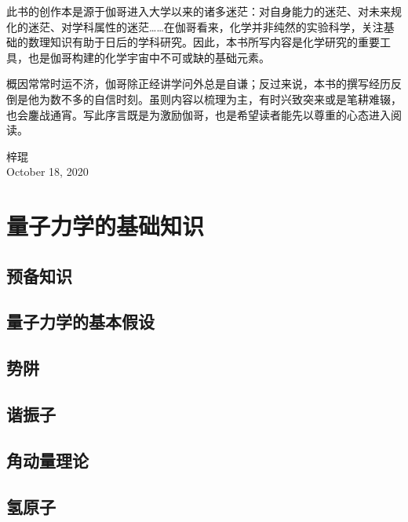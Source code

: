 \documentclass[cn,11pt,chinese,toc= twocol]{elegantbook}
\begin{document}
此书的创作本是源于伽哥进入大学以来的诸多迷茫：对自身能力的迷茫、对未来规化的迷茫、对学科属性的迷茫……在伽哥看来，化学并非纯然的实验科学，关注基础的数理知识有助于日后的学科研究。因此，本书所写内容是化学研究的重要工具，也是伽哥构建的化学宇宙中不可或缺的基础元素。

概因常常时运不济，伽哥除正经讲学问外总是自谦；反过来说，本书的撰写经历反倒是他为数不多的自信时刻。虽则内容以梳理为主，有时兴致突来或是笔耕难辍，也会鏖战通宵。写此序言既是为激励伽哥，也是希望读者能先以尊重的心态进入阅读。

\vskip 1.5cm

\begin{flushright}
梓琨\\
October 18, 2020
\end{flushright}

\tableofcontents

\mainmatter

\part{量子力学的基础知识}
\chapter{预备知识}
   

\chapter{量子力学的基本假设}\label{chapter2}
    
    
\chapter{势阱}
   


\chapter{谐振子}
    


\chapter{角动量理论}
    
 
\chapter{氢原子}
\end{document}
